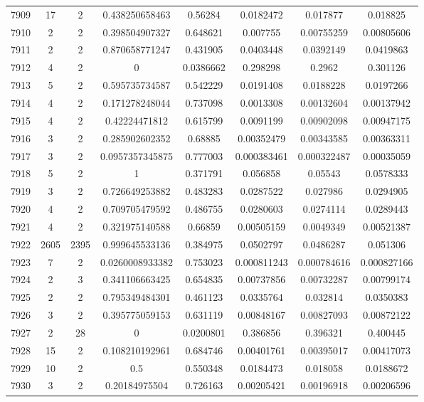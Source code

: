 \begin{longtable}{|c|c|c|c|c|c|c|c|}
7909 & 17 & 2 & 0.438250658463 & 0.56284 & 0.0182472 & 0.017877 & 0.018825 \\
7910 & 2 & 2 & 0.398504907327 & 0.648621 & 0.007755 & 0.00755259 & 0.00805606 \\
7911 & 2 & 2 & 0.870658771247 & 0.431905 & 0.0403448 & 0.0392149 & 0.0419863 \\
7912 & 4 & 2 & 0 & 0.0386662 & 0.298298 & 0.2962 & 0.301126 \\
7913 & 5 & 2 & 0.595735734587 & 0.542229 & 0.0191408 & 0.0188228 & 0.0197266 \\
7914 & 4 & 2 & 0.171278248044 & 0.737098 & 0.0013308 & 0.00132604 & 0.00137942 \\
7915 & 4 & 2 & 0.42224471812 & 0.615799 & 0.0091199 & 0.00902098 & 0.00947175 \\
7916 & 3 & 2 & 0.285902602352 & 0.68885 & 0.00352479 & 0.00343585 & 0.00363311 \\
7917 & 3 & 2 & 0.0957357345875 & 0.777003 & 0.000383461 & 0.000322487 & 0.00035059 \\
7918 & 5 & 2 & 1 & 0.371791 & 0.056858 & 0.05543 & 0.0578333 \\
7919 & 3 & 2 & 0.726649253882 & 0.483283 & 0.0287522 & 0.027986 & 0.0294905 \\
7920 & 4 & 2 & 0.709705479592 & 0.486755 & 0.0280603 & 0.0274114 & 0.0289443 \\
7921 & 4 & 2 & 0.321975140588 & 0.66859 & 0.00505159 & 0.0049349 & 0.00521387 \\
7922 & 2605 & 2395 & 0.999645533136 & 0.384975 & 0.0502797 & 0.0486287 & 0.051306 \\
7923 & 7 & 2 & 0.0260008933382 & 0.753023 & 0.000811243 & 0.000784616 & 0.000827166 \\
7924 & 2 & 3 & 0.341106663425 & 0.654835 & 0.00737856 & 0.00732287 & 0.00799174 \\
7925 & 2 & 2 & 0.795349484301 & 0.461123 & 0.0335764 & 0.032814 & 0.0350383 \\
7926 & 3 & 2 & 0.395775059153 & 0.631119 & 0.00848167 & 0.00827093 & 0.00872122 \\
7927 & 2 & 28 & 0 & 0.0200801 & 0.386856 & 0.396321 & 0.400445 \\
7928 & 15 & 2 & 0.108210192961 & 0.684746 & 0.00401761 & 0.00395017 & 0.00417073 \\
7929 & 10 & 2 & 0.5 & 0.550348 & 0.0184473 & 0.018058 & 0.0188672 \\
7930 & 3 & 2 & 0.20184975504 & 0.726163 & 0.00205421 & 0.00196918 & 0.00206596 \\

\end{longtable}
